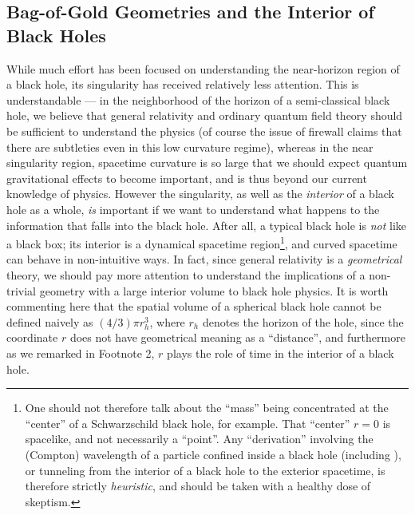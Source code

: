 \documentclass[12pt]{article}
\newcommand{\2}{$^2$}
\newcommand{\3}{$^3$}
\newcommand{\4}{$_4$}
\newcommand{\5}{$_5$}
\begin{document}
\subsection{Bag-of-Gold Geometries and the Interior of Black Holes}\label{goldbh}

While much effort has been focused on understanding the near-horizon region of a black hole, its singularity has received relatively less attention. This is understandable --- in the neighborhood of the horizon of a semi-classical black hole, we believe that general relativity and ordinary quantum field theory should be sufficient to understand the physics (of course the issue of firewall claims that there are subtleties even in this low curvature regime), whereas in the near singularity region, spacetime curvature is so large that we should expect quantum gravitational effects to become important, and is thus beyond our current knowledge of physics. However the singularity, as well as the \emph{interior} of a black hole as a whole, \emph{is} important if we want to understand what happens to the information that falls into the black hole. After all, a typical black hole is \emph{not} like a black box; its interior is a dynamical spacetime region\footnote{One should not therefore talk about the ``mass'' being concentrated at the ``center'' of a Schwarzschild black hole, for example. That ``center'' $r=0$ is spacelike, and not necessarily a ``point''. Any ``derivation'' involving the (Compton) wavelength of a particle confined inside a black hole (including \cite{pisin}), or tunneling from the interior of a black hole to the exterior spacetime, is therefore strictly \emph{heuristic}, and should be taken with a healthy dose of skeptism.}, and curved spacetime can behave in non-intuitive ways. In fact, since general relativity is a \emph{geometrical} theory, we should pay more attention to understand the implications of a non-trivial geometry with a large interior volume to black hole physics. It is worth commenting here that the spatial volume of a spherical black hole cannot be defined naively as $(4/3)\pi r_{{h}}^3$, where $r_{{h}}$ denotes the horizon of the hole, since the coordinate $r$ does not have geometrical meaning as a ``distance'', and furthermore as we remarked in Footnote 2, $r$ plays the role of time in the interior of a black hole. 
\end{document}

